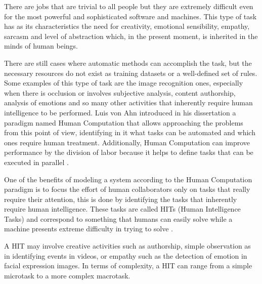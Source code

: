 There are jobs that are trivial to all people but they are extremely difficult even for the most powerful and sophisticated software and machines. This type of task has as its characteristics the need for creativity, emotional sensibility, empathy, sarcasm and level of abstraction which, in the present moment, is inherited in the minds of human beings.

There are still cases where automatic methods can accomplish the task, but the necessary resources do not exist as training datasets or a well-defined set of rules.
Some examples of this type of task are the image recognition ones, especially when there is occlusion or involves subjective analysis, content authorship, analysis of emotions and so many other activities that inherently require human intelligence to be performed. Luis von Ahn introduced in his dissertation  \cite{VonAhn:2005:HC:1168246}  a paradigm named Human Computation that allows approaching the problems from this point of view, identifying in it what tasks can be automated and which ones require human treatment. Additionally, Human Computation can improve performance by the division of labor because it helps to define tasks that can be executed in parallel  \cite{Rohwer:2010:NHC:1837885.1837897}.

One of the benefits of modeling a system according to the Human Computation paradigm is to focus the effort of human collaborators only on tasks that really require their attention, this is done by identifying the tasks that inherently require human intelligence. These tasks are called HITs (Human Intelligence Tasks) and correspond to something that humans can easily solve while a machine presents extreme difficulty in trying to solve \cite{doi:10.2200/S00371ED1V01Y201107AIM013}. 


A HIT may involve creative activities such as authorship, simple observation as in identifying events in videos, or empathy such as the detection of emotion in facial expression images. In terms of complexity, a HIT can range from a simple microtask to a more complex macrotask.



